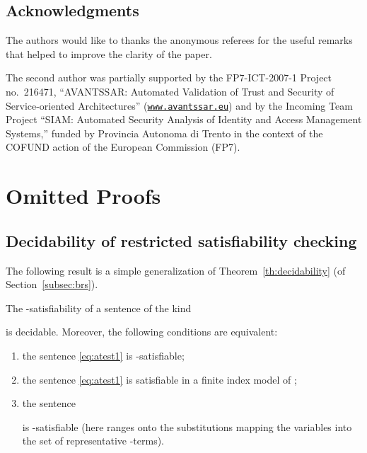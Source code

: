 \documentclass{LMCS}
\theoremstyle{plain}\newtheorem{assumption}[thm]{Assumption}
\theoremstyle{plain}\newtheorem{proposition}[thm]{Proposition}
\theoremstyle{plain}\newtheorem{property}[thm]{Property}
\theoremstyle{plain}\newtheorem{example}[thm]{Example}
\theoremstyle{plain}\newtheorem{claim}[thm]{Claim}
\theoremstyle{plain}\newtheorem{lemma}[thm]{Lemma}
\begin{document}
\subsection*{Acknowledgments} The authors would like to thanks the
anonymous referees for the useful remarks that helped to improve the
clarity of the paper.  

The second author was partially supported by the FP7-ICT-2007-1
Project no.\ 216471, ``AVANTSSAR: Automated Validation of Trust and
Security of Service-oriented Architectures''
(\texttt{\url{www.avantssar.eu}}) and by the Incoming Team
Project ``SIAM: Automated Security Analysis of Identity and Access
Management Systems,'' funded by Provincia Autonoma di Trento in the
context of the COFUND action of the European Commission (FP7).

  

\newpage

\appendix



\section{Omitted Proofs}
\label{app:proofs}


\subsection*{Decidability of restricted satisfiability checking}

The following result is a simple generalization of
Theorem~\ref{th:decidability} (of Section~\ref{subsec:brs}).

\begin{thm}
  \label{thm:pi01}
  The -satisfiability of a sentence of the kind
  
  is decidable. Moreover, the following conditions are equivalent:
  \begin{enumerate}[{\rm (i)}]
  \item\label{ite:pi01_1} the sentence \eqref{eq:atest1} is -satisfiable;
  \item\label{ite:pi01_2} the sentence \eqref{eq:atest1} is satisfiable in a finite index model of ;
  \item\label{ite:pi01_3} the sentence 
     
    is -satisfiable (here  ranges onto the
    substitutions mapping the variables  into the set of
    representative -terms).
\end{enumerate}
\end{thm}
\end{document}
